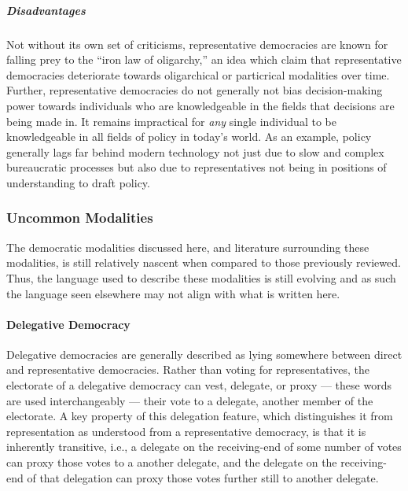 \subparagraph{Disadvantages} Not without its own set of criticisms,
representative democracies are known for falling prey to the ``iron law of
oligarchy,'' an idea which claim that representative democracies deteriorate
towards oligarchical or particrical modalities over time. Further,
representative democracies do not generally not bias decision-making power
towards individuals who are knowledgeable in the fields that decisions are being
made in. It remains impractical for \emph{any} single individual to be
knowledgeable in all fields of policy in today's world. As an example, policy
generally lags far behind modern technology not just due to slow and complex
bureaucratic processes but also due to representatives not being in positions of
understanding to draft policy.

\subsubsection{Uncommon Modalities}

The democratic modalities discussed here, and literature surrounding these
modalities, is still relatively nascent when compared to those previously
reviewed. Thus, the language used to describe these modalities is still evolving
and as such the language seen elsewhere may not align with what is written here.

\paragraph{Delegative Democracy}
Delegative democracies are generally described as lying somewhere between direct
and representative democracies. Rather than voting for representatives, the
electorate of a delegative democracy can vest, delegate, or proxy --- these
words are used interchangeably --- their vote to a delegate, another member of
the electorate. A key property of this delegation feature, which distinguishes
it from representation as understood from a representative democracy, is that it
is inherently transitive, i.e., a delegate on the receiving-end of some number
of votes can proxy those votes to a another delegate, and the delegate on the
receiving-end of that delegation can proxy those votes further still to another
delegate.


